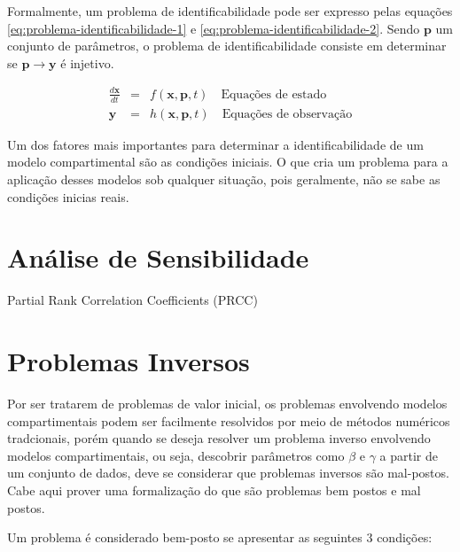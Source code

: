
Formalmente, um problema de identificabilidade pode ser expresso pelas equações
\ref{eq:problema-identificabilidade-1} e \ref{eq:problema-identificabilidade-2}.
Sendo $\mathbf{p}$ um conjunto de parâmetros, o problema de identificabilidade
consiste em determinar se $\mathbf{p} \rightarrow \mathbf{y}$ é injetivo. 

\begin{eqnarray}
\frac{d\mathbf{x}}{dt} &=& f(\mathbf{x}, \mathbf{p}, t) \quad \text{Equações de estado} \label{eq:problema-identificabilidade-1}\\
\mathbf{y} &=& h(\mathbf{x}, \mathbf{p}, t) \quad \text{Equações de observação} \label{eq:problema-identificabilidade-2}
\end{eqnarray}

Um dos fatores mais importantes para determinar a identificabilidade de um modelo
compartimental são as condições iniciais. O que cria um problema para a aplicação
desses modelos sob qualquer situação, pois geralmente, não se sabe as condições
inicias reais.

\section{Análise de Sensibilidade}

Partial Rank Correlation Coefficients (PRCC)

\section{Problemas Inversos}

Por ser tratarem de problemas de valor inicial, os problemas envolvendo modelos 
compartimentais podem ser facilmente resolvidos por meio de métodos numéricos 
tradcionais, porém quando se deseja resolver um problema inverso envolvendo modelos
compartimentais, ou seja, descobrir parâmetros como $\beta$ e $\gamma$ a partir
de um conjunto de dados, deve se considerar que problemas inversos são mal-postos.
Cabe aqui prover uma formalização do que são problemas bem postos e mal postos.

Um problema é considerado bem-posto se apresentar as seguintes 3 condições:

